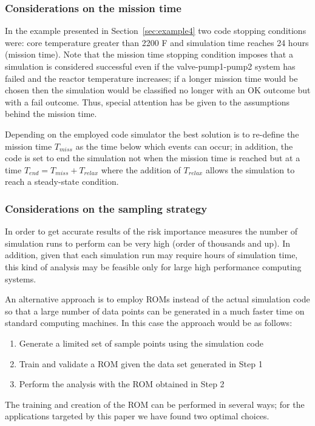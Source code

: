 \subsubsection{Considerations on the mission time}
\label{sec:missionTime}

In the example presented in Section~\ref{sec:example4} two code stopping conditions were: core temperature 
greater than 2200 F and simulation time reaches 24 hours (mission time).
Note that the mission time stopping condition imposes that a simulation is considered successful even if the
valve-pump1-pump2 system has failed and the reactor temperature increases; if a longer mission time would 
be chosen then the simulation would be classified no longer with an OK outcome but with a fail outcome.
Thus, special attention has be given to the assumptions behind the mission time. 

Depending on the employed code simulator the best solution is to re-define the mission time $T_{miss}$ as the 
time below which events can occur; in addition, the code is set to end the simulation not when the mission 
time is reached but at a time $T_{end} = T_{miss} + T_{relax}$ where the addition of $T_{relax}$ allows 
the simulation to reach a steady-state condition.

\subsubsection{Considerations on the sampling strategy}
\label{sec:samplingStrategy}

In order to get accurate results of the risk importance measures the number of simulation runs to perform 
can be very high (order of thousands and up). In addition, given that each simulation run may require 
hours of simulation time, this kind of analysis may be feasible only for large high performance computing 
systems.

An alternative approach is to employ ROMs instead of the actual simulation code so that a large number of 
data points can be generated in a much faster time on standard computing machines.
In this case the approach would be as follows:
\begin{enumerate}
  \item Generate a limited set of sample points using the simulation code 
  \item Train and validate a ROM given the data set generated in Step 1
  \item Perform the analysis with the ROM obtained in Step 2
\end{enumerate}
The training and creation of the ROM can be performed in several ways; for the applications targeted by this 
paper we have found two optimal choices.

